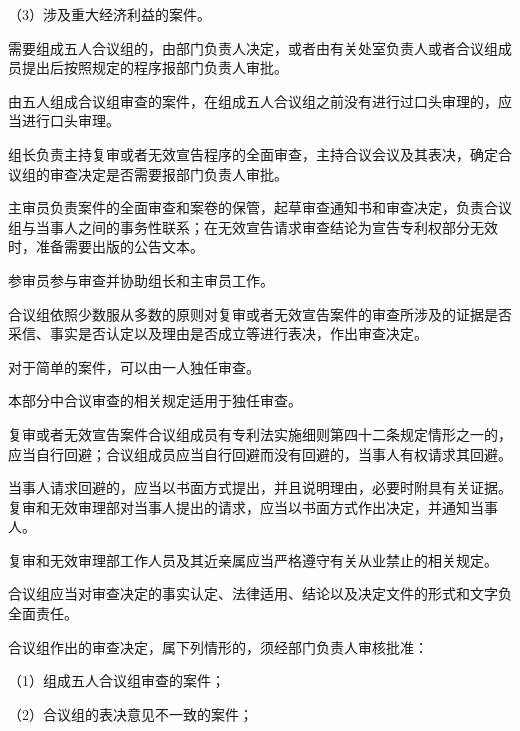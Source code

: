{\setlength{\parindent}{17.1bp}（3）涉及重大经济利益的案件。\par}

需要组成五人合议组的，由部门负责人决定，或者由有关处室负责人或者合议组成员提出后按照规定的程序报部门负责人审批。

由五人组成合议组审查的案件，在组成五人合议组之前没有进行过口头审理的，应当进行口头审理。

组长负责主持复审或者无效宣告程序的全面审查，主持合议会议及其表决，确定合议组的审查决定是否需要报部门负责人审批。

主审员负责案件的全面审查和案卷的保管，起草审查通知书和审查决定，负责合议组与当事人之间的事务性联系；在无效宣告请求审查结论为宣告专利权部分无效时，准备需要出版的公告文本。

参审员参与审查并协助组长和主审员工作。

合议组依照少数服从多数的原则对复审或者无效宣告案件的审查所涉及的证据是否采信、事实是否认定以及理由是否成立等进行表决，作出审查决定。

对于简单的案件，可以由一人独任审查。

本部分中合议审查的相关规定适用于独任审查。

复审或者无效宣告案件合议组成员有专利法实施细则第四十二条规定情形之一的，应当自行回避；合议组成员应当自行回避而没有回避的，当事人有权请求其回避。

当事人请求回避的，应当以书面方式提出，并且说明理由，必要时附具有关证据。复审和无效审理部对当事人提出的请求，应当以书面方式作出决定，并通知当事人。

复审和无效审理部工作人员及其近亲属应当严格遵守有关从业禁止的相关规定。

合议组应当对审查决定的事实认定、法律适用、结论以及决定文件的形式和文字负全面责任。

合议组作出的审查决定，属下列情形的，须经部门负责人审核批准：

{\setlength{\parindent}{17.1bp}（1）组成五人合议组审查的案件；\par}

{\setlength{\parindent}{17.1bp}（2）合议组的表决意见不一致的案件；\par}

